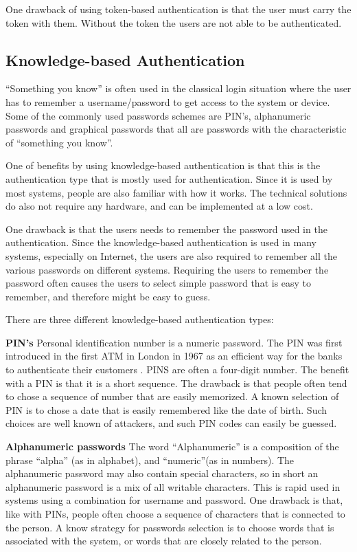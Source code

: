     One drawback of using token-based authentication is that the user must carry the token with them. Without the token the users are not able to be authenticated. 

    \subsection{Knowledge-based Authentication}
    ``Something you know'' is often used in the classical login situation where the user has to remember a username/password to get access to the system or device. Some of the commonly used passwords schemes are PIN's, alphanumeric passwords and graphical passwords that all are passwords with the characteristic of ``something you know''.

    One of benefits by using knowledge-based authentication is that this is the authentication type that is mostly used for authentication. Since it is used by most systems, people are also familiar with how it works. The technical solutions do also not require any hardware, and can be implemented at a low cost. 

    One drawback is that the users needs to remember the password used in the authentication. Since the knowledge-based authentication is used in many systems, especially on Internet, the users are also required to remember all the various passwords on different systems. Requiring the users to remember the password often causes the users to select simple password that is easy to remember, and therefore might be easy to guess. 

    There are three different knowledge-based authentication types:

      {\bf PIN's} Personal identification number is a numeric password. The PIN was first introduced in the first ATM in London in 1967 as an efficient way for the banks to authenticate their customers \cite{Bonneau1}. PINS are often a four-digit number. The benefit with a PIN is that it is a short sequence. The drawback is that people often tend to chose a sequence of number that are easily memorized. A known selection of PIN is to chose a date that is easily remembered like the date of birth. Such choices are well known of attackers, and such PIN codes can easily be guessed. 

      {\bf Alphanumeric passwords}
      The word ``Alphanumeric'' is a composition of the phrase ``alpha'' (as in alphabet), and ``numeric''(as in numbers). The alphanumeric password may also contain special characters, so in short an alphanumeric password is a mix of all writable characters. This is rapid used in systems using a combination for username and password. One drawback is that, like with PINs, people often choose a sequence of characters that is connected to the person. A know strategy for passwords selection is to choose words that is associated with the system, or words that are closely related to the person. 


